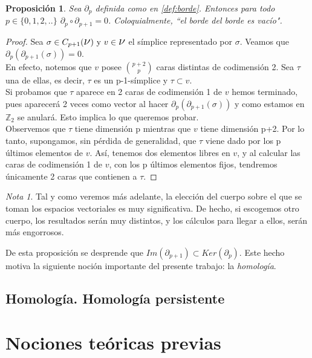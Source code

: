 \documentclass[12pt]{article}
\numberwithin{equation}{section}
\theoremstyle{definition}
\theoremstyle{remark}
\newtheorem*{remark}{Nota}
\theoremstyle{plain}
\newtheorem{prop}{Proposición}
\begin{document}
	\begin{prop}
		Sea $\partial_{p}$ definida como en \ref{def:borde}. Entonces 
		para todo $p \in \{0,1,2,..\}$ $\partial_{p}\circ 
		\partial_{p+1}=0$. Coloquialmente, ``el borde del borde es 
		vacío".
	\end{prop}
	\begin{proof}
		Sea $\sigma \in C_{p+1}(\text{{\Large $\nu$}})\text{ y }v\in 
		\text{{\Large $\nu$}}$ el símplice representado por $\sigma$. 
		Veamos que $\partial_{p}(\partial_{p+1}(\sigma))=0$.\\ 
		En efecto, notemos que $v$ posee $\binom{p+2}{p}$ 
		caras distintas de codimensión 2. Sea $\tau$ una de ellas, es 
		decir, $\tau$ es un p-1-símplice y $\tau \subset v$.\\ 
		Si probamos que $\tau$ aparece en 2 caras de codimensión 1 de 
		$v$ hemos terminado, pues aparecerá 2 veces como vector al 
		hacer $\partial_{p}(\partial_{p+1}(\sigma))$ y como estamos en 
		$\mathbb{Z}_{2}$ se anulará. Esto implica lo que queremos
		probar.\\
		Observemos que $\tau$ tiene dimensión p mientras que $v$ tiene
		dimensión p+2. Por lo tanto, supongamos, sin pérdida de 
		generalidad, que $\tau$ viene dado por los p últimos elementos 
		de $v$. Así, tenemos dos elementos libres en $v$, y al 
		calcular las caras de codimensión 1 de $v$, con los p últimos 
		elementos fijos, tendremos únicamente 2 caras que contienen a
		$\tau$.  	
	\end{proof}
	\begin{remark}
		Tal y como veremos más adelante, la elección del cuerpo sobre 
		el que se toman los espacios vectoriales es muy significativa.
		De hecho, si escogemos otro cuerpo, los resultados serán muy 
		distintos, y los cálculos para llegar a ellos, serán más 
		engorrosos.
	\end{remark}

	De esta proposición se desprende que $Im(\partial_{p+1}) \subset 
	Ker(\partial_{p})$. Este hecho motiva la siguiente noción 
	importante del presente trabajo: la \emph{homología}.
 

	\subsection{Homología. Homología persistente}
	
	\section{Nociones teóricas previas}
	
\end{document}
